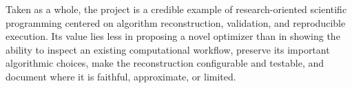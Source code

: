 \documentclass[11pt,a4paper]{article}
\begin{document}
Taken as a whole, the project is a credible example of research-oriented scientific programming centered on algorithm reconstruction, validation, and reproducible execution. Its value lies less in proposing a novel optimizer than in showing the ability to inspect an existing computational workflow, preserve its important algorithmic choices, make the reconstruction configurable and testable, and document where it is faithful, approximate, or limited.
\end{document}
